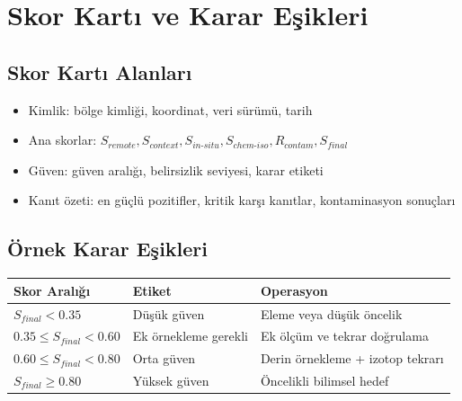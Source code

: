 \documentclass[12pt,a4paper]{article}
\begin{document}
\section{Skor Kartı ve Karar Eşikleri}
\subsection{Skor Kartı Alanları}
\begin{itemize}
    \item Kimlik: bölge kimliği, koordinat, veri sürümü, tarih
    \item Ana skorlar: $S_{remote}, S_{context}, S_{in\text{-}situ}, S_{chem\text{-}iso}, R_{contam}, S_{final}$
    \item Güven: güven aralığı, belirsizlik seviyesi, karar etiketi
    \item Kanıt özeti: en güçlü pozitifler, kritik karşı kanıtlar, kontaminasyon sonuçları
\end{itemize}

\subsection{Örnek Karar Eşikleri}
\begin{center}
\begin{tabular}{lll}
\toprule
\textbf{Skor Aralığı} & \textbf{Etiket} & \textbf{Operasyon} \\
\midrule
$S_{final} < 0.35$ & Düşük güven & Eleme veya düşük öncelik \\
$0.35 \leq S_{final} < 0.60$ & Ek örnekleme gerekli & Ek ölçüm ve tekrar doğrulama \\
$0.60 \leq S_{final} < 0.80$ & Orta güven & Derin örnekleme + izotop tekrarı \\
$S_{final} \geq 0.80$ & Yüksek güven & Öncelikli bilimsel hedef \\
\bottomrule
\end{tabular}
\end{center}
\end{document}
